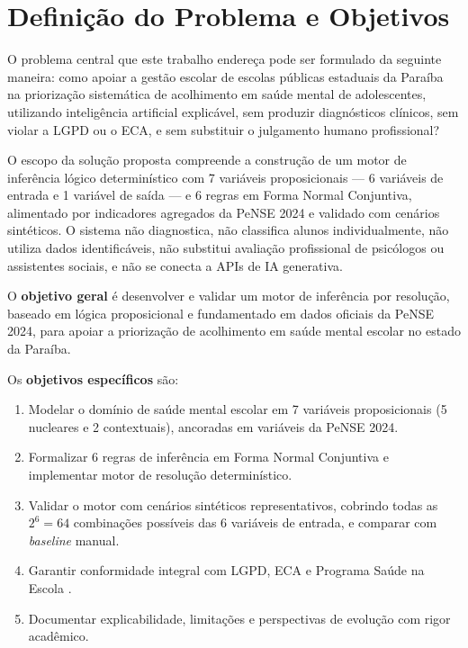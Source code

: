 \documentclass[
    12pt,
    openright,
    oneside,
    a4paper,
    english,
    brazil
]{abntex2}
\begin{document}
\chapter{Defini\c{c}\~ao do Problema e Objetivos}

O problema central que este trabalho endere\c{c}a pode ser formulado da seguinte maneira: como apoiar a gest\~ao escolar de escolas p\'ublicas estaduais da Para\'iba na prioriza\c{c}\~ao sistem\'atica de acolhimento em sa\'ude mental de adolescentes, utilizando intelig\^encia artificial explic\'avel, sem produzir diagn\'osticos cl\'inicos, sem violar a LGPD ou o ECA, e sem substituir o julgamento humano profissional?

O escopo da solu\c{c}\~ao proposta compreende a constru\c{c}\~ao de um motor de infer\^encia l\'ogico determin\'istico com 7 vari\'aveis proposicionais --- 6 vari\'aveis de entrada e 1 vari\'avel de sa\'ida --- e 6 regras em Forma Normal Conjuntiva, alimentado por indicadores agregados da PeNSE 2024 e validado com cen\'arios sint\'eticos. O sistema n\~ao diagnostica, n\~ao classifica alunos individualmente, n\~ao utiliza dados identific\'aveis, n\~ao substitui avalia\c{c}\~ao profissional de psic\'ologos ou assistentes sociais, e n\~ao se conecta a APIs de IA generativa.

O \textbf{objetivo geral} \'e desenvolver e validar um motor de infer\^encia por resolu\c{c}\~ao, baseado em l\'ogica proposicional e fundamentado em dados oficiais da PeNSE 2024, para apoiar a prioriza\c{c}\~ao de acolhimento em sa\'ude mental escolar no estado da Para\'iba.

Os \textbf{objetivos espec\'ificos} s\~ao:

\begin{enumerate}
    \item Modelar o dom\'inio de sa\'ude mental escolar em 7 vari\'aveis proposicionais (5 nucleares e 2 contextuais), ancoradas em vari\'aveis da PeNSE 2024.
    \item Formalizar 6 regras de infer\^encia em Forma Normal Conjuntiva e implementar motor de resolu\c{c}\~ao determin\'istico.
    \item Validar o motor com cen\'arios sint\'eticos representativos, cobrindo todas as $2^6 = 64$ combina\c{c}\~oes poss\'iveis das 6 vari\'aveis de entrada, e comparar com \textit{baseline} manual.
    \item Garantir conformidade integral com LGPD, ECA e Programa Sa\'ude na Escola \cite{brasil_pse_2007}.
    \item Documentar explicabilidade, limita\c{c}\~oes e perspectivas de evolu\c{c}\~ao com rigor acad\^emico.
\end{enumerate}
\end{document}
